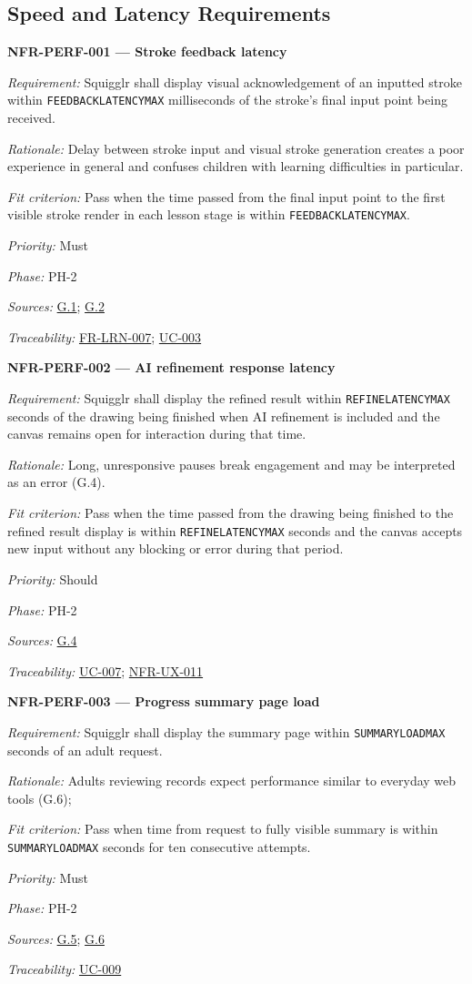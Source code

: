 \documentclass[12pt]{article}
\renewcommand{\_}{\textunderscore\allowbreak}%
\newcommand{\goalref}[1]{\hyperref[goal:#1]{G.#1}}
\newcommand{\ucref}[1]{\hyperref[uc:#1]{\mbox{UC-#1}}}
\newenvironment{srsrequirement}[2]{%
  \par\medskip\noindent\phantomsection\label{req:#1}%
  \textbf{#1 --- #2}\par\nobreak\smallskip }{\par\medskip}
\newcommand{\reqfield}[2]{\noindent\textit{#1:} #2\par}
\newcommand{\reqshall}[1]{\reqfield{Requirement}{#1}}
\newcommand{\reqrationale}[1]{\reqfield{Rationale}{#1}}
\newcommand{\reqfit}[1]{\reqfield{Fit criterion}{#1}}
\newcommand{\reqpriority}[1]{\reqfield{Priority}{#1}}
\newcommand{\reqphase}[1]{\reqfield{Phase}{#1}}
\newcommand{\reqsources}[1]{\reqfield{Sources}{#1}}
\newcommand{\reqtraces}[1]{\reqfield{Traceability}{#1}}
\newcommand{\reqref}[1]{\hyperref[req:#1]{#1}}
\providecommand{\ucref}[1]{\hyperref[uc:#1]{UC-#1}}
\begin{document}
\subsection{Speed and Latency Requirements}
\label{sec:speed}

\begin{srsrequirement}{NFR-PERF-001}{Stroke feedback latency}
  \reqshall{Squigglr shall display visual acknowledgement of an inputted stroke
within \texttt{FEEDBACK\_LATENCY\_MAX} milliseconds of the stroke's final input
point being received.} \reqrationale{Delay between stroke input and visual
stroke generation creates a poor experience in general and confuses children
with learning difficulties in particular.} \reqfit{Pass when the time passed
from the final input point to the first visible stroke render in each lesson
stage is within \texttt{FEEDBACK\_LATENCY\_MAX}.}
  \reqpriority{Must}
  \reqphase{PH-2}
  \reqsources{\goalref{1}; \goalref{2}} \reqtraces{\reqref{FR-LRN-007};
  \ucref{003}}
\end{srsrequirement}

\begin{srsrequirement}{NFR-PERF-002}{AI refinement response latency}
  \reqshall{Squigglr shall display the refined result within
\texttt{REFINE\_LATENCY\_MAX} seconds of the drawing being finished when AI
refinement is included and the canvas remains open for interaction during that
time.} \reqrationale{Long, unresponsive pauses break engagement and may be
interpreted as an error (G.4).} \reqfit{Pass when the time passed from the
drawing being finished to the refined result display is within
\texttt{REFINE\_LATENCY\_MAX} seconds and the canvas accepts new input without
any blocking or error during that period.}
  \reqpriority{Should}
  \reqphase{PH-2}
  \reqsources{\goalref{4}} \reqtraces{\ucref{007}; \reqref{NFR-UX-011}}
\end{srsrequirement}

\begin{srsrequirement}{NFR-PERF-003}{Progress summary page load}
  \reqshall{Squigglr shall display the summary page within
\texttt{SUMMARY\_LOAD\_MAX} seconds of an adult request.} \reqrationale{Adults
reviewing records expect performance similar to everyday web tools (G.6);}
\reqfit{Pass when time from request to fully visible summary is within
\texttt{SUMMARY\_LOAD\_MAX} seconds for ten consecutive attempts.}
  \reqpriority{Must}
  \reqphase{PH-2}
  \reqsources{\goalref{5}; \goalref{6}} \reqtraces{\ucref{009}}
\end{srsrequirement}
\end{document}
